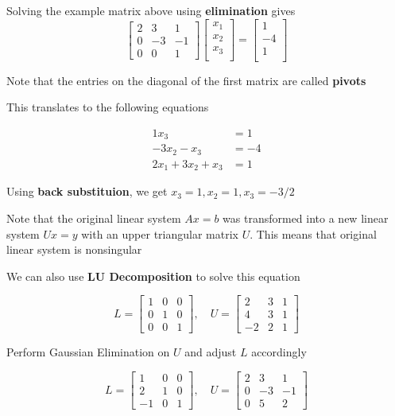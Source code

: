 \documentclass{article}
\begin{document}
Solving the example matrix above using \textbf{elimination} gives
\[ \left[ \begin{array}{ccc}
    2 & 3 & 1 \\
    0 & -3 & -1 \\
    0 & 0 & 1
\end{array} \right]
%
\left[ \begin{array}{c}
    x_1 \\
    x_2 \\
    x_3 \\
\end{array} \right]
 =
\left[ \begin{array}{c}
    1 \\
    -4 \\
    1 \\
\end{array} \right] \]

Note that the entries on the diagonal of the first matrix are called \textbf{pivots}

This translates to the following equations

\begin{align*}
  1 x_3 &= 1 \\
  -3x_2 - x_3 &= -4 \\
  2x_1 + 3x_2 + x_3 &= 1
\end{align*}

Using \textbf{back substituion}, we get $x_3 = 1, x_2 = 1, x_3 = -3/2$

Note that the original linear system $Ax = b$ was transformed into a new linear system $Ux = y$ with an upper triangular matrix $U$. This means that original linear system is nonsingular

We can also use \textbf{LU Decomposition} to solve this equation

\[ L = \begin{bmatrix} 1 & 0 & 0 \\ 0 & 1 & 0 \\ 0 & 0 & 1 \end{bmatrix}, \quad U = \begin{bmatrix} 2 & 3 & 1 \\ 4 & 3 & 1 \\ -2 & 2 & 1 \end{bmatrix}\]

Perform Gaussian Elimination on $U$ and adjust $L$ accordingly

\[ L = \begin{bmatrix} 1 & 0 & 0 \\ 2 & 1 & 0 \\ -1 & 0 & 1 \end{bmatrix}, \quad U = \begin{bmatrix} 2 & 3 & 1 \\ 0 & -3 & -1 \\ 0 & 5 & 2 \end{bmatrix}\]
\end{document}
